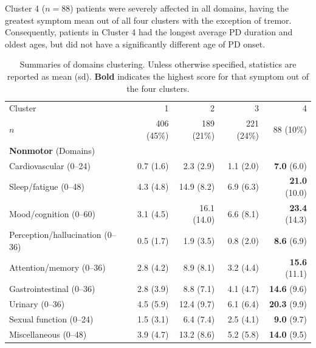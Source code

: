 \documentclass[preprint,5p]{elsarticle} %
\begin{document}
Cluster 4 ($n = 88$) patients were severely affected in all domains, having the greatest symptom
mean out of all four clusters with the exception of tremor. Consequently, patients in Cluster 4 had
the longest average PD duration and oldest ages, but did not have a significantly different age of
PD onset.

\begin{table}[t]
  \centering
  \caption{Summaries of domains clustering. Unless otherwise specified, statistics are
    reported as mean (sd). \textbf{Bold} indicates the highest score for that symptom out of the
  four clusters.}
  \label{tab:nmd}
  \begin{threeparttable}
  \begin{tabular}{l r r r r}
    \toprule
    Cluster & 1 & 2 & 3 & 4 \\
    $n$ & 406 (45\%) & 189 (21\%) & 221 (24\%) & 88 (10\%) \\
    \midrule
    \textbf{Nonmotor} (Domains) & & & & \\
    Cardiovascular (0--24) & 0.7 (1.6)\tnote{24} & 2.3 (2.9)\tnote{134} & 1.1 (2.0)\tnote{24} &
    \textbf{7.0} (6.0)\tnote{234} \\
    Sleep/fatigue (0--48) & 4.3 (4.8)\tnote{234} & 14.9 (8.2)\tnote{134} & 6.9 (6.3)\tnote{124}
    & \textbf{21.0} (10.0)\tnote{123} \\
    Mood/cognition (0--60) & 3.1 (4.5)\tnote{234} & 16.1 (14.0)\tnote{134} & 6.6
    (8.1)\tnote{124} & \textbf{23.4} (14.3)\tnote{123} \\
    Perception/hallucination (0--36) & 0.5 (1.7)\tnote{24} & 1.9 (3.5)\tnote{134} & 0.8
    (2.0)\tnote{24} & \textbf{8.6} (6.9)\tnote{123} \\
    Attention/memory (0--36) & 2.8 (4.2)\tnote{24} & 8.9 (8.1)\tnote{134} & 3.2 (4.4)\tnote{24} &
    \textbf{15.6} (11.1)\tnote{123} \\
    Gastrointestinal (0--36) & 2.8 (3.9)\tnote{234} & 8.8 (7.1)\tnote{134} & 4.1
    (4.7)\tnote{124} & \textbf{14.6} (9.6)\tnote{123} \\
    Urinary (0--36) & 4.5 (5.9)\tnote{234} & 12.4 (9.7)\tnote{134} & 6.1 (6.4)\tnote{124} &
    \textbf{20.3} (9.9)\tnote{123} \\
    Sexual function (0--24) & 1.5 (3.1)\tnote{24} & 6.4 (7.4)\tnote{134} & 2.5 (4.1)\tnote{24} &
    \textbf{9.0} (9.7)\tnote{123} \\
    Miscellaneous (0--48) & 3.9 (4.7)\tnote{24} & 13.2 (8.6)\tnote{13} & 5.2 (5.8)\tnote{24} &
    \textbf{14.0} (9.5)\tnote{13} \\

\end{tabular}
\end{threeparttable}
\end{table}
\end{document}
